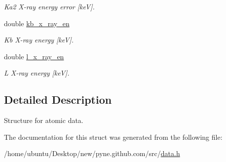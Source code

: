 \begin{DoxyCompactItemize}
\begin{DoxyCompactList}\small\item\em Ka2 X-\/ray energy error \mbox{[}keV\mbox{]}. \end{DoxyCompactList}\item 
double \hyperlink{structpyne_1_1atomic_aa93013778d65dc071c27564449e351de}{kb\+\_\+x\+\_\+ray\+\_\+en}\hypertarget{structpyne_1_1atomic_aa93013778d65dc071c27564449e351de}{}\label{structpyne_1_1atomic_aa93013778d65dc071c27564449e351de}

\begin{DoxyCompactList}\small\item\em Kb X-\/ray energy \mbox{[}keV\mbox{]}. \end{DoxyCompactList}\item 
double \hyperlink{structpyne_1_1atomic_a43e9e36e9b5bd8e4e77ffbe86b5ef28d}{l\+\_\+x\+\_\+ray\+\_\+en}\hypertarget{structpyne_1_1atomic_a43e9e36e9b5bd8e4e77ffbe86b5ef28d}{}\label{structpyne_1_1atomic_a43e9e36e9b5bd8e4e77ffbe86b5ef28d}

\begin{DoxyCompactList}\small\item\em L X-\/ray energy \mbox{[}keV\mbox{]}. \end{DoxyCompactList}\end{DoxyCompactItemize}


\subsection{Detailed Description}
Structure for atomic data. 

The documentation for this struct was generated from the following file\+:\begin{DoxyCompactItemize}
\item 
/home/ubuntu/\+Desktop/new/pyne.\+github.\+com/src/\hyperlink{data_8h}{data.\+h}\end{DoxyCompactItemize}
